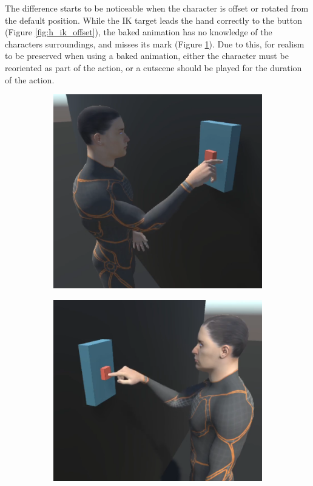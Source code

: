 The difference starts to be noticeable when the character is offset or rotated
from the default position. While the IK target leads the hand correctly to the
button (Figure \ref{fig:h_ik_offset}), the baked animation has no knowledge of
the characters surroundings, and misses its mark (Figure \ref{fig:h_b_offset}).
Due to this, for realism to be preserved when using a baked animation, either
the character must be reoriented as part of the action, or a cutscene should be
played for the duration of the action. 

\begin{figure}[h!]
    \centering
    \captionsetup{justification=centering}
    \begin{subfigure}{0.4\textwidth}
        \includegraphics[width=\linewidth]{grafika/h_b_offset.png}
        \label{fig:h_b_offset}
    \end{subfigure}
    \begin{subfigure}{0.4\textwidth}
        \includegraphics[width=\linewidth]{grafika/h_ik_offset.png}

\end{subfigure}
\end{figure}
